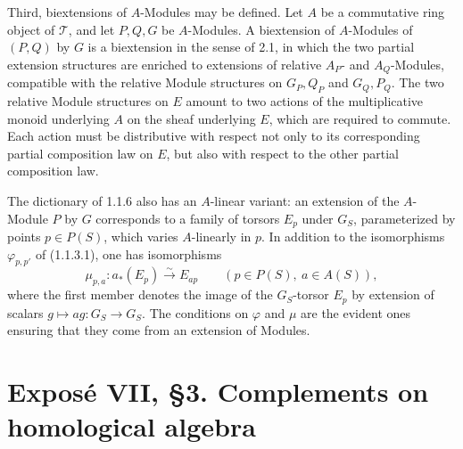 \documentclass[11pt]{article}
\providecommand{\Ker}{\operatorname{Ker}}
\providecommand{\id}{\operatorname{id}}
\begin{document}
Third, biextensions of \(A\)-Modules may be defined.  Let \(A\) be a commutative ring object of \(\mathcal T\), and let \(P,Q,G\) be \(A\)-Modules.  A biextension of \(A\)-Modules of \((P,Q)\) by \(G\) is a biextension in the sense of 2.1, in which the two partial extension structures are enriched to extensions of relative \(A_P\)- and \(A_Q\)-Modules, compatible with the relative Module structures on \(G_P,Q_P\) and \(G_Q,P_Q\).  The two relative Module structures on \(E\) amount to two actions of the multiplicative monoid underlying \(A\) on the sheaf underlying \(E\), which are required to commute.  Each action must be distributive with respect not only to its corresponding partial composition law on \(E\), but also with respect to the other partial composition law.

The dictionary of 1.1.6 also has an \(A\)-linear variant: an extension of the \(A\)-Module \(P\) by \(G\) corresponds to a family of torsors \(E_p\) under \(G_S\), parameterized by points \(p\in P(S)\), which varies \(A\)-linearly in \(p\).  In addition to the isomorphisms \(\varphi_{p,p'}\) of (1.1.3.1), one has isomorphisms
\begin{equation}\tag{2.10.3.1}
  \mu_{p,a}: a_*(E_p)\xrightarrow{\sim} E_{ap}
  \qquad(p\in P(S),\ a\in A(S)),
\end{equation}
where the first member denotes the image of the \(G_S\)-torsor \(E_p\) by extension of scalars \(g\mapsto ag:G_S\to G_S\).  The conditions on \(\varphi\) and \(\mu\) are the evident ones ensuring that they come from an extension of Modules.



\providecommand{\Biext}{\operatorname{Biext}}
\providecommand{\GrAb}{\operatorname{GrAb}}
\providecommand{\Coker}{\operatorname{Coker}}
\providecommand{\coker}{\operatorname{coker}}
\providecommand{\Ker}{\operatorname{Ker}}
\providecommand{\cofib}{\operatorname{cofib}}
\providecommand{\Dcat}{\mathrm D}
\providecommand{\Kcat}{\mathrm K}
\providecommand{\cPsi}{\mathcal\Psi}
\providecommand{\cY}{\mathcal Y}
\providecommand{\cC}{\mathcal C}
\providecommand{\cT}{\mathcal T}
\providecommand{\Hh}{\mathrm H}
\providecommand{\Tot}{\operatorname{Tot}}
\providecommand{\id}{\operatorname{id}}


\section*{Expos\'e VII, \S3. Complements on homological algebra}
\end{document}
